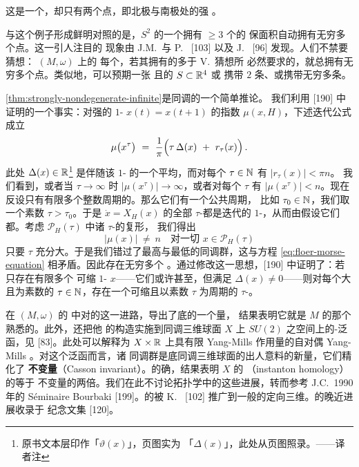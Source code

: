 这是一个\trHamiltonianMap，却只有两个\trPeriodic{}点，即北极与南极处的强%
\trNondegenerate\trFixedPoint。

与这个例子形成鲜明对照的是，$S^{2}$ 的一个拥有 $\geq3$ 个\trFixedPoint{}的%
保面积\trDiffeomorphism{}自动拥有无穷多个\trPeriodic{}点。这一引人注目的%
现象由 J.M.~\trGambaudo{}与 P.~\trLeCalvez{} [103] 以及 J.~\trFranks{} [96]%
发现。人们不禁要猜想：\trCompact\trSymplecticManifold{} $(M,\omega)$ 上的%
每个\trHamiltonianMap，若其拥有的\trFixedPoint{}多于 V.~\trArnold{}猜想所%
必然要求的，就总拥有无穷多个\trPeriodic{}点。类似地，可以预期一张%
\trCompact{}且\trStrictlyConvex{}的\trHypersurface{} $S\subset\mathbb{R}^{4}$ 或%
携带 $2$ 条、或携带无穷多条\trClosedCharacteristic。

\cref{thm:strongly-nondegenerate-infinite}是\trFloer{}同调的一个简单推论。%
我们利用 [190] 中证明的一个事实：对强\trNondegenerate{}的%
$1$-\trPeriodicSolution{} $x(t)=x(t+1)$ 的指数 $\mu(x,H)$，下述迭代公式成立
\[
\mu\bigl(x^{\tau}\bigr)\ =\ \frac{1}{\pi}\Bigl(\tau\,\Delta(x)\ +\ r_{\tau}(x)\Bigr)\,.
\]
此处 $\Delta(x)\in\mathbb{R}$\footnote{原书文本层印作「$\vartheta(x)$」，页图实为%
「$\Delta(x)$」，此处从页图照录。——译者注} 是伴随该 $1$-\trPeriodicSolution{}%
的一个平均\trWindingNumber，而对每个 $\tau\in\mathbb{N}$ 有 $|r_{\tau}(x)|<\pi n$。%
我们看到，或者当 $\tau\to\infty$%
时 $|\mu(x^{\tau})|\to\infty$，或者对每个 $\tau$ 有 $|\mu(x^{\tau})|<n$。现在%
反设只有有限多个整数周期的\trPeriodicSolution。那么它们有一个公共周期，%
比如 $\tau_{0}\in\mathbb{N}$，我们取一个素数 $\tau>\tau_{0}$。于是%
$\dot{x}=X_{H}(x)$ 的全部 $\tau$-\trPeriodicSolution{}都是迭代的%
$1$-\trPeriodicSolution{}，从而由假设它们都\trNondegenerate。考虑%
$\mathcal{P}_{H}(\tau)$ 中诸 $\tau$-\trPeriodicSolution{}的\trFloer{}复形，%
我们得出
\[
\bigl|\mu(x)\bigr|\ \neq\ n\quad\text{对一切 }x\in\mathcal{P}_{H}(\tau)
\]
只要 $\tau$ 充分大。于是我们错过了最高与最低的同调群，这与\trMorse{}方程%
\eqref{eq:floer-morse-equation} 相矛盾。因此存在无穷多个%
\trPeriodicSolution。通过修改这一思想，[190] 中证明了：若只存在有限多个%
可缩 $1$-\trPeriodicSolution{} $x$——它们或许甚至\trDegenerate，但满足%
$\Delta(x)\neq0$——则对每个大且为素数的 $\tau\in\mathbb{N}$，存在一个可缩且以素数%
$\tau$ 为周期的 $\tau$-\trPeriodicSolution。

\trFloer{}在\trCompact\trSymplecticManifold{} $(M,\omega)$ 的\trLoopSpace{}%
中对\trMorseTheory{}的这一进路，导出了底\trManifold{}的一个\trInvariant{}量，%
结果表明它就是 $M$ 的那个熟悉的\trSingularHomology。此外，\trFloer{}还把他%
的构造实施到同调三维球面 $X$ 上 $SU(2)$ \trConnection{}之空间上的\trChern-\trSimons{}泛函，见%
[83]。此处\trConnectingOrbit{}可以解释为\trManifold{} $X\times\mathbb{R}$ 上具有限%
Yang-Mills 作用量的自对偶 Yang-Mills \trConnection。对这个泛函而言，诸\trFloer{}%
同调群是底同调三维球面的出人意料的新\trInvariant{}量，它们精化了%
\textbf{\trCasson{}不变量}（Casson invariant）。的确，结果表明 $X$ 的\trFloer{}%
\textbf{\trInstantonHomology}（instanton homology）的\trEulerCharacteristic{}等于\trCasson{}%
不变量的两倍。我们在此不讨论拓扑学中的这些进展，转而参考%
J.C.~\trSikorav{}1990 年的 Séminaire Bourbaki [199]。\trFloer{}的\trInstantonHomology{}被%
K.~\trFukaya{} [102] 推广到一般的定向三维\trManifold。\trInstantonHomology{}的晚近进展收录于%
\trFloer{}纪念文集 [120]。
